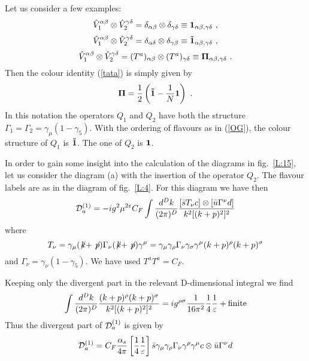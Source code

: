 \documentclass[12pt,rotate]{article}
\def\as{\alpha_s}
\newcommand{\be}{\begin{equation}}
\newcommand{\ee}{\end{equation}}
\begin{document}
\begin{itemize}
\begin{itemize}
\begin{itemize}
Let us consider a few examples:
\be\label{V1}
\hat V_1^{\alpha\beta}\otimes\hat V_2^{\gamma\delta}=
\delta_{\alpha\beta}\otimes\delta_{\gamma\delta}
\equiv{\bf 1}_{\alpha\beta,\gamma\delta}~,
\ee
\be\label{V2}
\hat V_1^{\alpha\beta}\otimes\hat V_2^{\gamma\delta}=
\delta_{\alpha\delta}\otimes\delta_{\gamma\beta}
\equiv{\bf\tilde 1}_{\alpha\beta,\gamma\delta}~,
\ee
\be\label{V3}
\hat V_1^{\alpha\beta}\otimes\hat V_2^{\gamma\delta}=
(T^a)_{\alpha\beta}\otimes(T^a)_{\gamma\delta}
\equiv{\bf \Pi}_{\alpha\beta,\gamma\delta}~.
\ee
Then the colour identity (\ref{tata}) is simply given by
\be\label{CI}
{\bf \Pi}=\frac{1}{2}\left({\bf \tilde 1}-\frac{1}{N}{\bf 1}\right)~.
\ee
In this notation the operators $Q_1$ and $Q_2$ have both the
structure $\Gamma_1=\Gamma_2=\gamma_\mu(1-\gamma_5)$. With the
ordering of flavours as in (\ref{OG}), the colour structure of
$Q_1$ is ${\bf\tilde 1}$. The one of $Q_2$ is ${\bf 1}$.

In order to gain some insight into the calculation of the diagrams
in fig.~\ref{L:15}, let us consider the diagram (a) with the insertion
of the operator $Q_2$. The flavour labels are as in the diagram of
fig.~\ref{L:4}. 
For this diagram we have then
\be\label{DIAG}  
{\cal D}_a^{(1)}=-i g^2\mu^{2\varepsilon} C_F
\int \frac{d^D k}{(2\pi)^D}
\frac{[\bar s T_\nu c]\otimes[\bar u \Gamma^\nu d]}
{k^2[(k+p)^2]^2}
\ee
where
\be\label{TNU}
T_\nu=\gamma_\mu(\not\! k+\not\! p)\Gamma_\nu (\not\! k+\not\! p)\gamma^\mu
=\gamma_\mu\gamma_\rho\Gamma_\nu\gamma_\sigma\gamma^\mu
(k+p)^\rho (k+p)^\sigma
\ee
and $\Gamma_\nu=\gamma_\nu(1-\gamma_5)$. We have used $T^a T^a=C_F$.

Keeping only the divergent part in the relevant D-dimensional integral
we find
\be\label{INTR}
\int \frac{d^D k}{(2\pi)^D}
\frac{(k+p)^\rho (k+p)^\sigma}
{k^2[(k+p)^2]^2}=i g^{\rho\sigma} \frac{1}{16\pi^2}\frac{1}{4}
\frac{1}{\varepsilon}+{\rm finite}
\ee
Thus the divergent part of ${\cal D}_a^{(1)}$ is given by
\be\label{DADIV}
{\cal D}_a^{(1)}=C_F\frac{\as}{4\pi}
\left[\frac{1}{4}\frac{1}{\varepsilon}\right]
\bar s\gamma_\mu\gamma_\rho\Gamma_\nu\gamma^\rho\gamma^\mu c\otimes
\bar u \Gamma^\nu d
\ee


\end{itemize}
\end{itemize}
\end{itemize}
\end{document}
